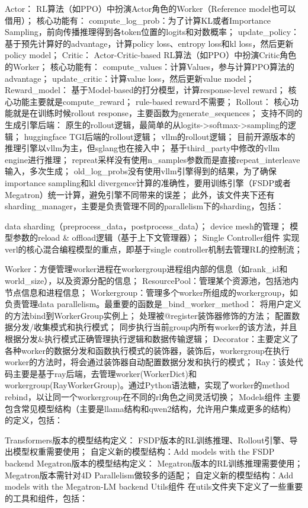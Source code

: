 \documentclass{pkuthesis}
\begin{document}
Actor：
RL算法（如PPO）中扮演Actor角色的Worker（Reference model也可以借用）；
核心功能有：
compute_log_prob：为了计算KL或者Importance Sampling，前向传播推理得到各token位置的logits和对数概率；
update_policy：基于预先计算好的advantage，计算policy loss、entropy loss和kl loss，然后更新policy model；
Critic：
Actor-Critic-based RL算法（如PPO）中扮演Critic角色的Worker；
核心功能有：
compute_values：计算Values，参与计算PPO算法的advantage；
update_critic：计算value loss，然后更新value model；
Reward_model：
基于Model-based的打分模型，计算response-level reward；
核心功能主要就是compute_reward；
rule-based reward不需要；
Rollout：
核心功能就是在训练时候rollout response，主要函数为generate_sequences；
支持不同的生成引擎后端：
原生的rollout逻辑，最简单的从logits->softmax->sampling的逻辑；
huggingface TGI后端的rollout逻辑；
vllm的rollout逻辑；
目前开源版本的推理引擎以vllm为主，但sglang也在接入中；
基于third_party中修改的vllm engine进行推理；
repreat采样没有使用n_samples参数而是直接repeat_interleave输入，多次生成；
old_log_probs没有使用vllm引擎得到的结果，为了确保importance sampling和kl divergence计算的准确性，要用训练引擎（FSDP或者Megatron）统一计算，避免引擎不同带来的误差；
此外，该文件夹下还有sharding_manager，主要是负责管理不同的parallelism下的sharding，包括：

data sharding（preprocess_data，postprocess_data）；
device mesh的管理；
模型参数的reload & offload逻辑（基于上下文管理器）；
Single Controller组件
实现verl的核心混合编程模型的重点，即基于single controller机制去管理RL的控制流；

Worker：方便管理worker进程在workergroup进程组内部的信息（如rank_id和world_size），以及资源分配的信息；
ResourcePool：管理某个资源池，包括池内节点信息和进程信息；
Workergroup：管理多个worker所组成的workergroup，如负责管理data parallelism。最重要的函数是_bind_worker_method：
将用户定义的方法bind到WorkerGroup实例上；
处理被@register装饰器修饰的方法；
配置数据分发/收集模式和执行模式；
同步执行当前group内所有worker的该方法，并且根据分发&执行模式正确管理执行逻辑和数据传输逻辑；
Decorator：主要定义了各种worker的数据分发和函数执行模式的装饰器，装饰后，workergroup在执行worker的方法时，将会通过装饰器自动配置数据分发和执行的模式；
Ray：该处代码主要是基于ray后端，去管理worker(WorkerDict)和workergroup(RayWorkerGroup)。通过Python语法糖，实现了worker的method rebind，以让同一个workergroup在不同的rl角色之间灵活切换；
Models组件
主要包含常见模型结构（主要是llama结构和qwen2结构，允许用户集成更多的结构）的定义，包括：

Transformers版本的模型结构定义：
FSDP版本的RL训练推理、Rollout引擎、导出模型权重需要使用；
自定义新的模型结构：Add models with the FSDP backend
Megatron版本的模型结构定义：
Megatron版本的RL训练推理需要使用；
Megatron版本需针对4D Parallelism做较多的适配；
自定义新的模型结构：Add models with the Megatron-LM backend
Utils组件
在utils文件夹下定义了一些重要的工具和组件，包括：
\end{document}

